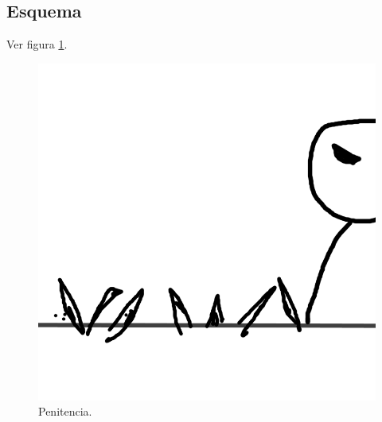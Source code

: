 \subsection{Esquema}
			Ver figura \ref{fig:penitencia}.
			\begin{figure}
				\centering
				\includegraphics[height=0.2 \textheight]{Imagenes/penitencia}
				\caption{Penitencia.}
				\label{fig:penitencia}
			\end{figure}

